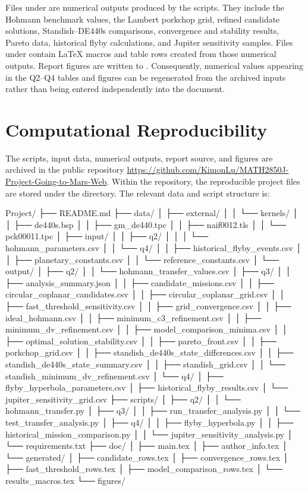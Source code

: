 \documentclass[11pt,a4paper]{article}
\begin{document}
Files under  are numerical outputs produced by the scripts.
They include the Hohmann benchmark values, the Lambert porkchop grid, refined
candidate solutions, Standish--DE440s comparisons, convergence and stability
results, Pareto data, historical flyby calculations, and Jupiter sensitivity
samples. Files under  contain LaTeX macros and table rows
created from those numerical outputs. Report figures are written to
. Consequently, numerical values appearing in the Q2--Q4 tables
and figures can be regenerated from the archived inputs rather than being
entered independently into the document.

\section{Computational Reproducibility}
\label{app:reproducibility}

The scripts, input data, numerical outputs, report source, and figures are
archived in the public repository
\url{https://github.com/KimonLu/MATH2850J-Project-Going-to-Mars-Web}.
Within the repository, the reproducible project files are stored under the
 directory. The relevant data and script structure is:

\begin{filetree}
Project/
├── README.md
├── data/
│   ├── external/
│   │   └── kernels/
│   │       ├── de440s.bsp
│   │       ├── gm_de440.tpc
│   │       ├── naif0012.tls
│   │       └── pck00011.tpc
│   ├── input/
│   │   ├── q2/
│   │   │   └── hohmann_parameters.csv
│   │   └── q4/
│   │       ├── historical_flyby_events.csv
│   │       ├── planetary_constants.csv
│   │       └── reference_constants.csv
│   └── output/
│       ├── q2/
│       │   └── hohmann_transfer_values.csv
│       ├── q3/
│       │   ├── analysis_summary.json
│       │   ├── candidate_missions.csv
│       │   ├── circular_coplanar_candidates.csv
│       │   ├── circular_coplanar_grid.csv
│       │   ├── fast_threshold_sensitivity.csv
│       │   ├── grid_convergence.csv
│       │   ├── ideal_hohmann.csv
│       │   ├── minimum_c3_refinement.csv
│       │   ├── minimum_dv_refinement.csv
│       │   ├── model_comparison_minima.csv
│       │   ├── optimal_solution_stability.csv
│       │   ├── pareto_front.csv
│       │   ├── porkchop_grid.csv
│       │   ├── standish_de440s_state_differences.csv
│       │   ├── standish_de440s_state_summary.csv
│       │   ├── standish_grid.csv
│       │   └── standish_minimum_dv_refinement.csv
│       └── q4/
│           ├── flyby_hyperbola_parameters.csv
│           ├── historical_flyby_results.csv
│           └── jupiter_sensitivity_grid.csv
├── scripts/
│   ├── q2/
│   │   └── hohmann_transfer.py
│   ├── q3/
│   │   ├── run_transfer_analysis.py
│   │   └── test_transfer_analysis.py
│   ├── q4/
│   │   ├── flyby_hyperbola.py
│   │   ├── historical_mission_comparison.py
│   │   └── jupiter_sensitivity_analysis.py
│   └── requirements.txt
├── doc/
│   ├── main.tex
│   ├── author_info.tex
│   └── generated/
│       ├── candidate_rows.tex
│       ├── convergence_rows.tex
│       ├── fast_threshold_rows.tex
│       ├── model_comparison_rows.tex
│       └── results_macros.tex
└── figures/
\end{filetree}
\end{document}
